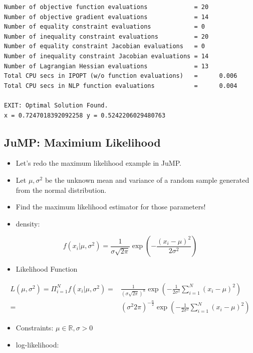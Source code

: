 \documentclass[11pt]{article}
\providecommand{\tightlist}{%
      \setlength{\itemsep}{0pt}\setlength{\parskip}{0pt}}
\begin{document}
\begin{Verbatim}[commandchars=\\\{\}]
Number of objective function evaluations             = 20
Number of objective gradient evaluations             = 14
Number of equality constraint evaluations            = 0
Number of inequality constraint evaluations          = 20
Number of equality constraint Jacobian evaluations   = 0
Number of inequality constraint Jacobian evaluations = 14
Number of Lagrangian Hessian evaluations             = 13
Total CPU secs in IPOPT (w/o function evaluations)   =      0.006
Total CPU secs in NLP function evaluations           =      0.004

EXIT: Optimal Solution Found.
x = 0.7247018392092258 y = 0.5242206029480763

    \end{Verbatim}

    \subsection{JuMP: Maximium Likelihood}\label{jump-maximium-likelihood}

\begin{itemize}
\tightlist
\item
  Let's redo the maximum likelihood example in JuMP.
\item
  Let \(\mu,\sigma^2\) be the unknown mean and variance of a random
  sample generated from the normal distribution.
\item
  Find the maximum likelihood estimator for those parameters!
\item
  density:
\end{itemize}

\[ f(x_i|\mu,\sigma^2) = \frac{1}{\sigma \sqrt{2\pi}} \exp\left(-\frac{(x_i - \mu)^2}{2\sigma^2}\right) 
\]

\begin{itemize}
\tightlist
\item
  Likelihood Function
\end{itemize}

\[ \begin{aligned} 
L(\mu,\sigma^2) = \Pi_{i=1}^N f(x_i|\mu,\sigma^2) =& \frac{1}{(\sigma \sqrt{2\pi})^n} \exp\left(-\frac{1}{2\sigma^2} \sum_{i=1}^N (x_i-\mu)^2 \right) \\
     =& \left(\sigma^2 2\pi\right)^{-\frac{n}{2}} \exp\left(-\frac{1}{2\sigma^2} \sum_{i=1}^N (x_i-\mu)^2 \right) 
\end{aligned} 
\]

\begin{itemize}
\tightlist
\item
  Constraints: \(\mu\in \mathbb{R},\sigma>0\)
\item
  log-likelihood:
\end{itemize}
\end{document}
